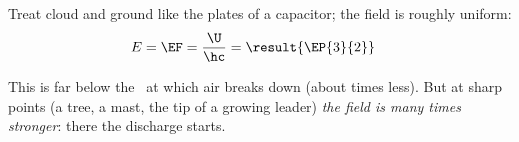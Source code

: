 \begin{abcliste}
\abc Treat cloud and ground like the plates of a capacitor; the field is roughly uniform:
\begin{align}
 E &= \EF = \frac{\U}{\hc} = \result{\EP{3}{2}}
\end{align}

\abc This is far below the \EbO\ at which air breaks down (about  times less). But at sharp points (a tree, a mast, the tip of a growing leader) \emph{the field is many times stronger}: there the discharge starts.
\end{abcliste}

